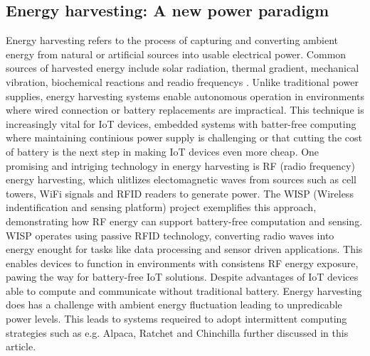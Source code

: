 \documentclass[article,a4paper]{IEEEtran}
\begin{document}
\subsection{Energy harvesting: A new power paradigm}
Energy harvesting refers to the process of capturing and converting ambient energy from natural or artificial sources into usable electrical power. Common sources of harvested energy include solar radiation, thermal gradient, mechanical vibration, biochemical reactions and readio frequencys \cite{Energyharvest1}. Unlike traditional power supplies, energy harvesting systems enable autonomous operation in environments where wired connection or battery replacements are impractical. This technique is increasingly vital for IoT devices, embedded systems with batter-free computing where maintaining continious power supply is challenging or that cutting the cost of battery is the next step in making IoT devices even more cheap.
\newline\newline 
One promising and intriging technology in energy harvesting is RF (radio frequency) energy harvesting, which ulitlizes electomagnetic waves from sources such as cell towers, WiFi signals and RFID readers to generate power. The WISP (Wireless indentification and sensing platform) project exemplifies this approach, demonstrating how RF energy can support battery-free computation and sensing. WISP operates using passive RFID technology, converting radio waves into energy enought for tasks like data processing and sensor driven applications. This enables devices to function in environments with consistens RF energy exposure, pawing the way for battery-free IoT solutions.
\newline 
Despite advantages of IoT devices able to compute and communicate without traditional battery. Energy harvesting does has a challenge with ambient energy fluctuation leading to unpredicable power levels. This leads to systems requeired to adopt intermittent computing strategies such as e.g. Alpaca, Ratchet and Chinchilla further discussed in this article. 
\end{document}
